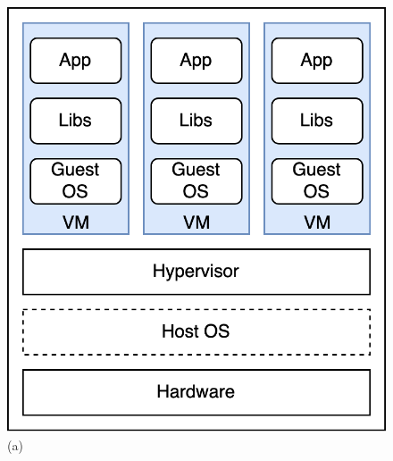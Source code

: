 \begin{figure}[H]
    \centering
    \begin{minipage}{0.4\textwidth}
        \centering
        \includegraphics[width=\linewidth]{images/content/vm-architecture}
        \captionsetup{justification=raggedright,singlelinecheck=false}%
        \vspace{-0.7cm}%
        \caption*{(a)}
    \end{minipage}%
    \hspace{0.075\textwidth}%
    \begin{minipage}{0.4\textwidth}
        \centering

\end{minipage}
\end{figure}
